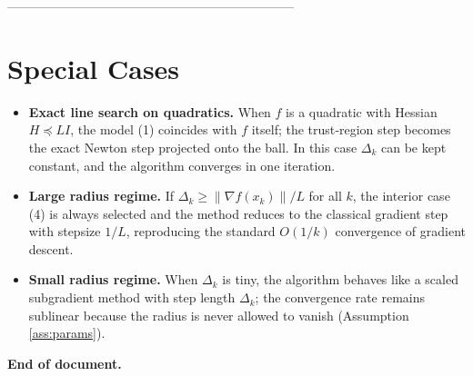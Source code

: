 \documentclass{article}
\begin{document}
--------------------------------------------------------------------

\section*{Special Cases}
\begin{itemize}
\item \textbf{Exact line search on quadratics.}  
When $f$ is a quadratic with Hessian $H\preceq L I$, the model (1) coincides
with $f$ itself; the trust‑region step becomes the exact Newton step
projected onto the ball.  In this case $\Delta_{k}$ can be kept constant,
and the algorithm converges in one iteration.

\item \textbf{Large radius regime.}  
If $\Delta_{k}\ge \|\nabla f(x_{k})\|/L$ for all $k$, the interior case (4) is always
selected and the method reduces to the classical gradient step with stepsize
$1/L$, reproducing the standard $O(1/k)$ convergence of gradient descent.

\item \textbf{Small radius regime.}  
When $\Delta_{k}$ is tiny, the algorithm behaves like a scaled subgradient
method with step length $\Delta_{k}$; the convergence rate remains
sublinear because the radius is never allowed to vanish (Assumption
\ref{ass:params}).
\end{itemize}

\bigskip
\noindent\textbf{End of document.}
\end{document}
